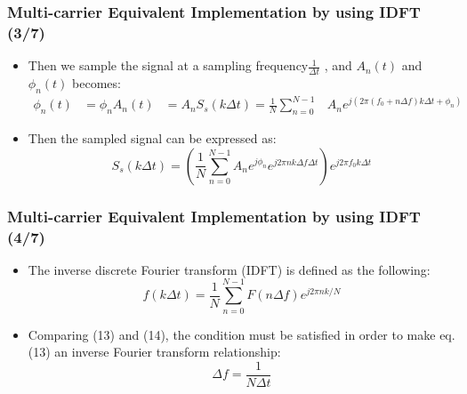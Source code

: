 \documentclass[xcolor=dvipsnames,aspectratio=169]{beamer} %
\def\\{}%
\begin{document}
\begin{frame}
    \frametitle{Multi-carrier Equivalent Implementation by using IDFT (3/7)}
    \begin{itemize}
        \item  Then we sample the signal at a sampling frequency$\frac{1}{\Delta t}$ , and $A_{n}(t)$ and $\phi_{n}(t)$ becomes:
        \begin{align}
            \phi_{n}(t)&=\phi_{n}\\
            A_{n}(t)&=A_{n}\\
            S_{s}(k\Delta t)=\frac{1}{N}\sum_{n=0}^{N-1}&A_{n}e^{j(2\pi(f_{0}+n\Delta f)k\Delta t+\phi_{n})}
        \end{align}
    \end{itemize}
    \begin{itemize}
        \item Then the sampled signal can be expressed as:
        \begin{equation}
            S_{s}(k\Delta t)=(\frac{1}{N}\sum_{n=0}^{N-1}A_{n}e^{j\phi_{n}}e^{j2\pi nk\Delta f\Delta t})e^{j2\pi f_{0}k\Delta t}       
        \end{equation}
    \end{itemize}
\end{frame}
\begin{frame}
    \frametitle{Multi-carrier Equivalent Implementation by using IDFT (4/7)}
    \begin{itemize}
        \item The inverse discrete Fourier transform (IDFT) is defined as the following:
        \begin{equation}
            f(k\Delta t)=\frac{1}{N}\sum_{n=0}^{N-1}F(n\Delta f)e^{j2\pi nk/N}
        \end{equation}
    \end{itemize}
    \begin{itemize}
        \item Comparing (13) and (14), the condition must be satisfied in order to make eq.(13) an inverse Fourier transform relationship:
        \begin{equation}
            \Delta f=\frac{1}{N\Delta t}
        \end{equation}
    \end{itemize}
\end{frame}
\end{document}
